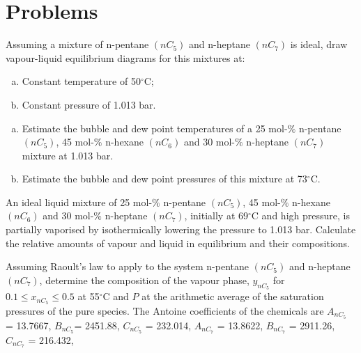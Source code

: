 \section{Problems}
\begin{MyTutorial}{}%
%
  \begin{problem}\label{Chapter:VLE:Problem:01}\citep{Sandler_Book} %
     Assuming a mixture of n-pentane $\left(nC_{5}\right)$ and n-heptane $\left(nC_{7}\right)$ is ideal, draw vapour-liquid equilibrium diagrams for this mixtures at:
    \begin{enumerate}[a)]
        \item Constant temperature of 50$^{\circ}$C;
        \item Constant pressure of 1.013 bar.
    \end{enumerate}
  \end{problem}
%
  \begin{problem}\label{Chapter:VLE:Problem:02}\citep{Sandler_Book} %
    \begin{enumerate}[a)]
        \item Estimate the bubble and dew point temperatures of a 25 mol-$\%$ n-pentane $\left(nC_{5}\right)$, 45 mol-$\%$ n-hexane $\left(nC_{6}\right)$ and 30 mol-$\%$ n-heptane $\left(nC_{7}\right)$ mixture at 1.013 bar. 
        \item  Estimate the bubble and dew point pressures of this mixture at 73$^{\circ}$C.
    \end{enumerate}
  \end{problem}
%
  \begin{problem}\label{Chapter:VLE:Problem:03}\citep{Sandler_Book} %
     An ideal liquid mixture of 25 mol-$\%$ n-pentane $\left(nC_{5}\right)$, 45 mol-$\%$ n-hexane $\left(nC_{6}\right)$ and 30 mol-$\%$ n-heptane $\left(nC_{7}\right)$, initially at 69$^{\circ}$C and high pressure, is partially vaporised by isothermically lowering the pressure to 1.013 bar. Calculate the relative amounts of vapour and liquid in equilibrium and their compositions.
  \end{problem}
%
  \begin{problem}\label{Chapter:VLE:Problem:04} %
     Assuming Raoult's law to apply to the system n-pentane $\left(nC_{5}\right)$ and n-heptane $\left(nC_{7}\right)$, determine the composition of the vapour phase, $y_{nC_{5}}$ for $0.1\leq x_{nC_{5}}\leq 0.5$ at 55$^{\circ}$C and $P$ at the arithmetic average of the saturation pressures of the pure species. The Antoine coefficients of the chemicals are $A_{nC_{5}}$ = 13.7667, $B_{nC_{5}}$= 2451.88, $C_{nC_{5}}$ = 232.014, $A_{nC_{7}}$ = 13.8622, $B_{nC_{7}}$ = 2911.26, $C_{nC_{7}}$ = 216.432,

\end{problem}
\end{MyTutorial}
